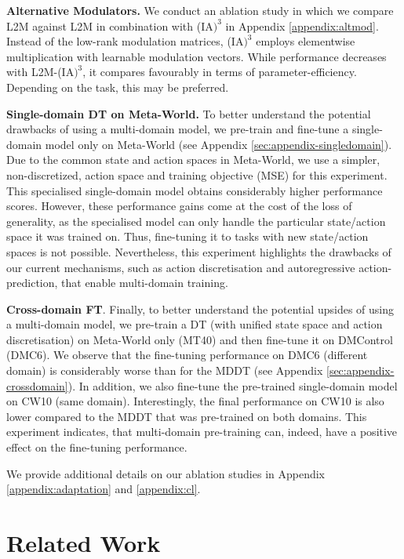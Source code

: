 \documentclass{article}
\begin{document}
\textbf{Alternative Modulators.} %
We conduct an ablation study in which we compare L2M against L2M in combination with (IA$\text{)}^3$ in Appendix \ref{appendix:altmod}.
Instead of the low-rank modulation matrices, (IA$\text{)}^3$ employs elementwise multiplication with learnable modulation vectors. 
While performance decreases with L2M-(IA$\text{)}^3$, it compares favourably in terms of parameter-efficiency. Depending on the task, this may be preferred. 

\textbf{Single-domain DT on Meta-World.}
To better understand the potential drawbacks of using a multi-domain model, we pre-train and fine-tune a single-domain model only on Meta-World (see Appendix \ref{sec:appendix-singledomain}). 
Due to the common state and action spaces in Meta-World, we use a simpler, non-discretized, action space and training objective (MSE) for this experiment.
This specialised single-domain model obtains considerably higher performance scores. 
However, these performance gains come at the cost of the loss of generality, as the specialised model can only handle the particular state/action space it was trained on. 
Thus, fine-tuning it to tasks with new state/action spaces is not possible. 
Nevertheless, this experiment highlights the drawbacks of our current mechanisms, such as action discretisation and autoregressive action-prediction, that enable multi-domain training. 

\textbf{Cross-domain FT}. 
Finally, to better understand the potential upsides of using a multi-domain model, we pre-train a DT (with unified state space and action discretisation) on Meta-World only (MT40) and then fine-tune it on DMControl (DMC6).
We observe that the fine-tuning performance on DMC6 (different domain) is considerably worse than for the MDDT (see Appendix \ref{sec:appendix-crossdomain}). 
In addition, we also fine-tune the pre-trained single-domain model on CW10 (same domain). 
Interestingly, the final performance on CW10 is also lower compared to the MDDT that was pre-trained on both domains.
This experiment indicates, that multi-domain pre-training can, indeed, have a positive effect on the fine-tuning performance.

We provide additional details on our ablation studies in Appendix \ref{appendix:adaptation} and \ref{appendix:cl}.

\section{Related Work}\label{sec:relatedwork}
\end{document}
